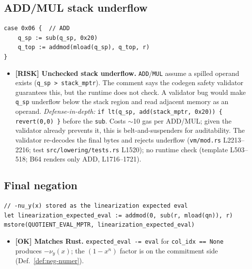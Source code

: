\subsection{ADD/MUL stack underflow}
\begin{lstlisting}[style=yul]
case 0x06 {  // ADD
    q_sp := sub(q_sp, 0x20)
    q_top := addmod(mload(q_sp), q_top, r)
}
\end{lstlisting}
\begin{itemize}
  \item \textcolor{rustorange}{\textbf{[RISK] Unchecked stack
        underflow.}} \texttt{ADD}/\texttt{MUL} assume a spilled operand
        exists (\texttt{q\_\allowbreak{}sp > stack\_\allowbreak{}mptr}). The comment says the
        codegen safety validator guarantees this, but the runtime does
        not check. A validator bug would make \texttt{q\_sp} underflow
        below the stack region and read adjacent memory as an operand.
        \emph{Defense-in-depth:}
        \texttt{if lt(q\_\allowbreak{}sp, add(stack\_\allowbreak{}mptr, 0x20)) \{ revert(0,0) \}}
        before the \texttt{sub}. Costs $\sim$10 gas per ADD/MUL; given
        the validator already prevents it, this is belt-and-suspenders
        for auditability.  The validator re-decodes the
        final bytes and rejects underflow (\texttt{vm/mod.rs}
        L2213--2216; test \texttt{src/\allowbreak{}lowering/\allowbreak{}tests.rs} L1520); no
        runtime check (template L503--518; B64 renders only ADD,
        L1716--1721).
\end{itemize}

\subsection{Final negation}
\label{sec:vm-final-neg}
\begin{lstlisting}[style=yul]
// -nu_y(x) stored as the linearization expected eval
let linearization_expected_eval := addmod(0, sub(r, mload(qn)), r)
mstore(QUOTIENT_EVAL_MPTR, linearization_expected_eval)
\end{lstlisting}
\begin{itemize}
  \item \textcolor{tracegreen}{\textbf{[OK] Matches Rust.}}
        \texttt{expected\_\allowbreak{}eval -= eval} for \texttt{col\_idx == None}
        produces $-\nu_y(x)$; the $(1-x^n)$ factor is on the commitment
        side (Def.~\ref{def:neg-numer}).
\end{itemize}

